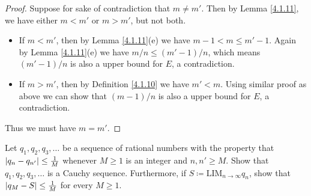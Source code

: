 \begin{proof}
    Suppose for sake of contradiction that \(m \neq m'\).
    Then by Lemma \ref{4.1.11}, we have either \(m < m'\) or \(m > m'\), but not both.
    \begin{itemize}
        \item If \(m < m'\), then by Lemma \ref{4.1.11}(e) we have \(m - 1 < m \leq m' - 1\).
              Again by Lemma \ref{4.1.11}(e) we have \(m / n \leq (m' - 1) / n\), which means \((m' - 1) / n\) is also a upper bound for \(E\), a contradiction.
        \item If \(m > m'\), then by Definition \ref{4.1.10} we have \(m' < m\).
              Using similar proof as above we can show that \((m - 1) / n\) is also a upper bound for \(E\), a contradiction.
    \end{itemize}
    Thus we must have \(m = m'\).
\end{proof}

\begin{exercise}\label{ex 5.5.4}
    Let \(q_1, q_2, q_3, \dots\) be a sequence of rational numbers with the property that \(\left\lvert q_n - q_{n'}\right\rvert \leq \frac{1}{M}\) whenever \(M \geq 1\) is an integer and \(n, n' \geq M\).
    Show that \(q_1, q_2, q_3, \dots\) is a Cauchy sequence.
    Furthermore, if \(S \coloneqq \text{LIM}_{n \to \infty} q_n\), show that \(\left\lvert q_M - S\right\rvert \leq \frac{1}{M}\) for every \(M \geq 1\).
\end{exercise}

